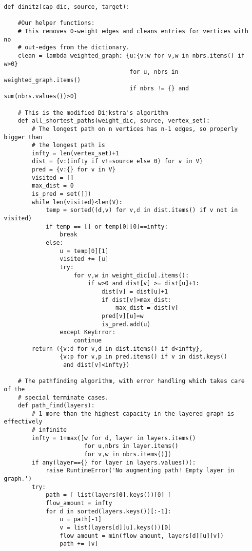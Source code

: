\documentclass[m3380-lec-main.tex]{subfiles}
\begin{document}
\bc
\begin{verbatim}
def dinitz(cap_dic, source, target):
    
    #Our helper functions:
    # This removes 0-weight edges and cleans entries for vertices with no 
    # out-edges from the dictionary.
    clean = lambda weighted_graph: {u:{v:w for v,w in nbrs.items() if w>0} 
                                    for u, nbrs in weighted_graph.items() 
                                    if nbrs != {} and sum(nbrs.values())>0}
    
    # This is the modified Dijkstra's algorithm
    def all_shortest_paths(weight_dic, source, vertex_set):
        # The longest path on n vertices has n-1 edges, so properly bigger than 
        # the longest path is
        infty = len(vertex_set)+1 
        dist = {v:(infty if v!=source else 0) for v in V}
        pred = {v:{} for v in V}
        visited = []
        max_dist = 0
        is_pred = set([])
        while len(visited)<len(V):
            temp = sorted((d,v) for v,d in dist.items() if v not in visited)
            if temp == [] or temp[0][0]==infty:
                break
            else:
                u = temp[0][1]
                visited += [u]
                try:
                    for v,w in weight_dic[u].items(): 
                        if w>0 and dist[v] >= dist[u]+1:
                            dist[v] = dist[u]+1
                            if dist[v]>max_dist:
                                max_dist = dist[v]
                            pred[v][u]=w
                            is_pred.add(u)
                except KeyError:
                    continue
        return ({v:d for v,d in dist.items() if d<infty},
                {v:p for v,p in pred.items() if v in dist.keys() 
                 and dist[v]<infty})

    # The pathfinding algorithm, with error handling which takes care of the 
    # special terminate cases.
    def path_find(layers):
        # 1 more than the highest capacity in the layered graph is effectively 
        # infinite
        infty = 1+max([w for d, layer in layers.items() 
                       for u,nbrs in layer.items() 
                       for v,w in nbrs.items()])
        if any(layer=={} for layer in layers.values()):
            raise RuntimeError('No augmenting path! Empty layer in graph.')
        try:
            path = [ list(layers[0].keys())[0] ]
            flow_amount = infty
            for d in sorted(layers.keys())[:-1]:
                u = path[-1]
                v = list(layers[d][u].keys())[0]
                flow_amount = min(flow_amount, layers[d][u][v])
                path += [v]
            

\end{verbatim}
\end{document}
